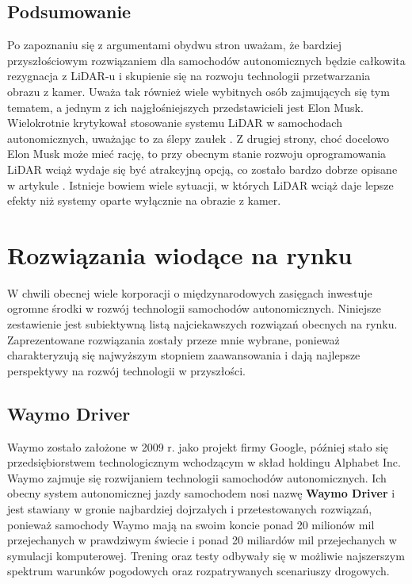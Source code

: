 \subsection{Podsumowanie}
Po zapoznaniu się z argumentami obydwu stron uważam, że bardziej przyszłościowym rozwiązaniem dla samochodów autonomicznych będzie całkowita rezygnacja z LiDAR-u i skupienie się na rozwoju technologii przetwarzania obrazu z kamer. Uważa tak również wiele wybitnych osób zajmujących się tym tematem, a jednym z ich najgłośniejszych przedstawicieli jest Elon Musk. Wielokrotnie krytykował stosowanie systemu LiDAR w samochodach autonomicznych, uważając to za ślepy zaułek \cite{burns:elonMuskLidar}. Z drugiej strony, choć docelowo Elon Musk może mieć rację, to przy obecnym stanie rozwoju oprogramowania LiDAR wciąż wydaje się być atrakcyjną opcją, co zostało bardzo dobrze opisane w artykule \cite{forbes:muskWarOnLidar}. Istnieje bowiem wiele sytuacji, w których LiDAR wciąż daje lepsze efekty niż systemy oparte wyłącznie na obrazie z kamer.

\section{Rozwiązania wiodące na rynku}
W chwili obecnej wiele korporacji o międzynarodowych zasięgach inwestuje ogromne środki w rozwój technologii samochodów autonomicznych. Niniejsze zestawienie jest subiektywną listą najciekawszych rozwiązań obecnych na rynku. Zaprezentowane rozwiązania zostały przeze mnie wybrane, ponieważ charakteryzują się najwyższym stopniem zaawansowania i dają najlepsze perspektywy na rozwój technologii w przyszłości.

\subsection{Waymo Driver}
Waymo zostało założone w 2009 r. jako projekt firmy Google, później stało się przedsiębiorstwem technologicznym wchodzącym w skład holdingu Alphabet Inc. Waymo zajmuje się rozwijaniem technologii samochodów autonomicznych. Ich obecny system autonomicznej jazdy samochodem nosi nazwę \textbf{Waymo Driver} i jest stawiany w gronie najbardziej dojrzałych i przetestowanych rozwiązań, ponieważ samochody Waymo mają na swoim koncie ponad 20 milionów mil przejechanych w prawdziwym świecie i ponad 20 miliardów mil przejechanych w symulacji komputerowej. Trening oraz testy odbywały się w możliwie najszerszym spektrum warunków pogodowych oraz rozpatrywanych scenariuszy drogowych.


